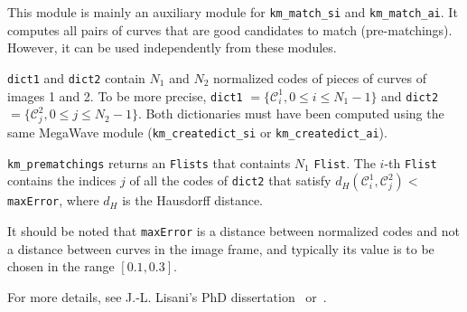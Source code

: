 This module is mainly an auxiliary module for
\verb+km_match_si+ and \verb+km_match_ai+. It
computes all pairs of curves that are good candidates to match
(pre-matchings). However, it can be used independently from
these modules.

\verb+dict1+ and \verb+dict2+ contain $N_1$ and $N_2$ normalized codes
of pieces of curves of images 1 and 2. To be more precise,
\verb+dict1+ $=\{{\mathcal C}^1_i, 0 \leq i \leq N_1-1 \}$ and
\verb+dict2+ $=\{{\mathcal C}^2_j, 0 \leq j \leq N_2-1 \}$.  Both
dictionaries must have been computed using the same MegaWave module
(\verb+km_createdict_si+ or \verb+km_createdict_ai+).

\verb+km_prematchings+ returns an \verb+Flists+ that containts $N_1$
\verb+Flist+. The $i$-th \verb+Flist+ contains the indices $j$ of all
the codes of \verb+dict2+ that satisfy 
$d_H({\mathcal C}^1_i,{\mathcal C}^2_j) < $ \verb+maxError+, 
where $d_H$ is the Hausdorff distance. 

It should be noted that \verb+maxError+ is a distance between
normalized codes and not a distance between curves in the image frame,
and typically its value is to be chosen in the range $[0.1,0.3]$.

\medskip

For more details, see J.-L. Lisani's PhD dissertation~\cite{lisani:comparaison} 
or~\cite{lisani.monasse.ea:on}.
